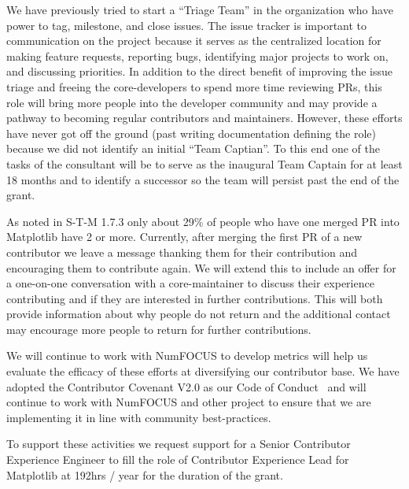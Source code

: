 \documentclass[12pt]{article}
\numberwithin{page}{section}
\begin{document}
We have previously tried to start a ``Triage Team'' in the organization who
have power to tag, milestone, and close issues.  The issue tracker is important
to communication on the project because it serves as the centralized location
for making feature requests, reporting bugs, identifying major projects to work
on, and discussing priorities.  In addition to the direct benefit of improving
the issue triage and freeing the core-developers to spend more time reviewing
PRs, this role will bring more people into the developer community and may
provide a pathway to becoming regular contributors and maintainers.  However,
these efforts have never got off the ground (past writing documentation
defining the role) because we did not identify an initial ``Team Captian''.
To this end one of the tasks of the consultant will be to serve as the inaugural
Team Captain for at least 18 months and to identify a successor so the team will
persist past the end of the grant.

As noted in S-T-M 1.7.3 only about 29\% of people who have one merged
PR into Matplotlib have 2 or more.  Currently, after merging the first PR of
a new contributor we leave a message thanking them for their contribution and
encouraging them to contribute again.  We will extend this to include an offer
for a one-on-one conversation with a core-maintainer to discuss their experience
contributing and if they are interested in further contributions.  This will
both provide information about why people do not return and the additional contact
may encourage more people to return for further contributions.
%

We will continue to work with NumFOCUS to develop metrics will help us evaluate
the efficacy of these efforts at diversifying our contributor base.  We have
adopted the Contributor Covenant V2.0 as our Code of Conduct~\cite{CoC} and
will continue to work with NumFOCUS and other project to ensure that we are
implementing it in line with community best-practices.



To support these activities we request support for a Senior Contributor
Experience Engineer to fill the role of Contributor Experience Lead for
Matplotlib at 192hrs / year for the duration of the grant.
\end{document}

